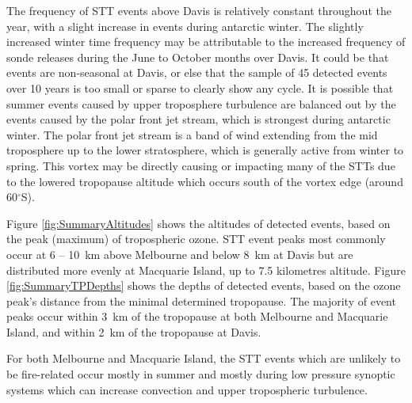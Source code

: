\documentclass{article}
\begin{document}
  The frequency of STT events above Davis is relatively constant throughout the year, with a slight increase in events during antarctic winter.
  The slightly increased winter time frequency may be attributable to the increased frequency of sonde releases during the June to October months over Davis.
  It could be that events are non-seasonal at Davis, or else that the sample of 45 detected events over 10 years is too small or sparse to clearly show any cycle.
  It is possible that summer events caused by upper troposphere turbulence are balanced out by the events caused by the polar front jet stream, which is strongest during antarctic winter.
  The polar front jet stream is a band of wind extending from the mid troposphere up to the lower stratosphere, which is generally active from winter to spring. 
  This vortex may be directly causing or impacting many of the STTs due to the lowered tropopause altitude which occurs south of the vortex edge (around 60$^\circ$S).

  Figure \ref{fig:SummaryAltitudes} shows the altitudes of detected events, based on the peak (maximum) of tropospheric ozone.
  STT event peaks most commonly occur at 6 -- 10~km above Melbourne and below 8~km at Davis but are distributed more evenly at Macquarie Island, up to 7.5 kilometres altitude.
  Figure \ref{fig:SummaryTPDepths} shows the depths of detected events, based on the ozone peak's distance from the minimal determined tropopause.
  The majority of event peaks occur within 3~km of the tropopause at both Melbourne and Macquarie Island, and within 2~km of the tropopause at Davis.
  
  For both Melbourne and Macquarie Island, the STT events which are unlikely to be fire-related occur mostly in summer and mostly during low pressure synoptic systems which can increase convection and upper tropospheric turbulence.
\end{document}
